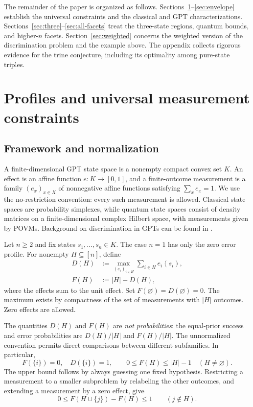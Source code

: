 \documentclass[a4paper,11pt,onecolumn,unpublished]{quantumarticle}
\theoremstyle{definition}
\newcommand{\1}{\mathbf 1}
\begin{document}
The remainder of the paper is organized as follows.
Sections~\ref{sec:setup}--\ref{sec:envelope} establish the universal constraints
and the classical and GPT characterizations.
Sections~\ref{sec:three}--\ref{sec:all-facets} treat the three-state regions,
quantum bounds, and higher-$n$ facets. Section~\ref{sec:weighted} concerns the
weighted version of the discrimination problem and the example above. The
appendix collects rigorous evidence for the trine conjecture, including its
optimality among pure-state triples.

\section{Profiles and universal measurement constraints}\label{sec:setup}

\subsection{Framework and normalization}

A finite-dimensional GPT state space is a nonempty compact convex set $K$.
An effect is an affine function $e:K\to[0,1]$, and a finite-outcome measurement
is a family $(e_x)_{x\in X}$ of nonnegative affine functions satisfying
$\sum_xe_x=1$. We use the no-restriction convention: every such measurement is
allowed. Classical state spaces are probability simplexes, while quantum state
spaces consist of density matrices on a finite-dimensional complex Hilbert
space, with measurements given by POVMs. Background on discrimination in GPTs
can be found in \cite{KimuraMiyaderaImai2009,NuidaKimuraMiyadera2010}.

Let $n\ge2$ and fix states $s_1,\ldots,s_n\in K$. The case $n=1$ has only the
zero error profile. For nonempty $H\subseteq[n]$, define
\begin{align}
 D(H)&:=\max_{(e_i)_{i\in H}}\sum_{i\in H}e_i(s_i),\label{eq:D-def}\\
 F(H)&:=|H|-D(H),\label{eq:F-def}
\end{align}
where the effects sum to the unit effect. Set $F(\varnothing)=D(\varnothing)=0$.
The maximum exists by compactness of the set of measurements with $|H|$
outcomes. Zero effects are allowed.

The quantities $D(H)$ and $F(H)$ are \emph{not probabilities}: the equal-prior
success and error probabilities are $D(H)/|H|$ and $F(H)/|H|$. The
unnormalized convention permits direct comparisons between different
subfamilies. In particular,
\begin{equation}\label{eq:normalization}
 F(\{i\})=0,\quad D(\{i\})=1,\qquad
 0\le F(H)\le |H|-1\quad(H\ne\varnothing).
\end{equation}
The upper bound follows by always guessing one fixed hypothesis. Restricting a
measurement to a smaller subproblem by relabeling the other outcomes, and
extending a measurement by a zero effect, give
\begin{equation}\label{eq:increment}
 0\le F(H\cup\{j\})-F(H)\le1\qquad(j\notin H).
\end{equation}
\end{document}
